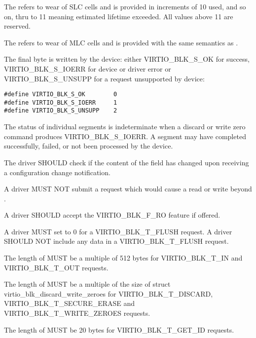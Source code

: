 The  refers to wear of SLC cells and is provided
in increments of 10%
used, and so on, thru to 11 meaning estimated lifetime exceeded.
All values above 11 are reserved.

The  refers to wear of MLC cells and is provided
with the same semantics as .

The final  byte is written by the device: either
VIRTIO_BLK_S_OK for success, VIRTIO_BLK_S_IOERR for device or driver
error or VIRTIO_BLK_S_UNSUPP for a request unsupported by device:

\begin{lstlisting}
#define VIRTIO_BLK_S_OK        0
#define VIRTIO_BLK_S_IOERR     1
#define VIRTIO_BLK_S_UNSUPP    2
\end{lstlisting}

The status of individual segments is indeterminate when a discard or write zero
command produces VIRTIO_BLK_S_IOERR.  A segment may have completed
successfully, failed, or not been processed by the device.


The driver SHOULD check if the content of the  field has
changed upon receiving a configuration change notification.

A driver MUST NOT submit a request which would cause a read or write
beyond .

A driver SHOULD accept the VIRTIO_BLK_F_RO feature if offered.

A driver MUST set  to 0 for a VIRTIO_BLK_T_FLUSH request.
A driver SHOULD NOT include any data in a VIRTIO_BLK_T_FLUSH request.

The length of  MUST be a multiple of 512 bytes for VIRTIO_BLK_T_IN
and VIRTIO_BLK_T_OUT requests.

The length of  MUST be a multiple of the size of struct
virtio_blk_discard_write_zeroes for VIRTIO_BLK_T_DISCARD,
VIRTIO_BLK_T_SECURE_ERASE and VIRTIO_BLK_T_WRITE_ZEROES requests.

The length of  MUST be 20 bytes for VIRTIO_BLK_T_GET_ID requests.

